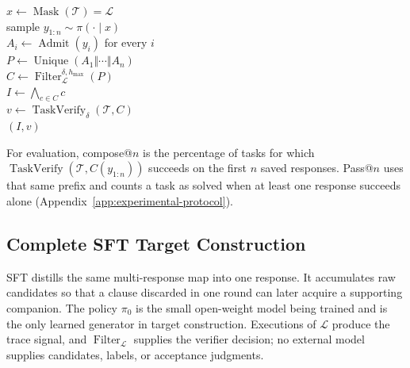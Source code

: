 \begin{algorithm}[H]
\caption{CRAFT inference}
\label{alg:rcf}
\begin{algorithmic}
\algline \(x\leftarrow\operatorname{Mask}(\mathcal T)=\mathcal L\)\\
\algline sample \(y_{1:n}\sim\pi(\cdot\mid x)\)\\
\algline \(A_i\leftarrow\operatorname{Admit}(y_i)\) for every \(i\)\\
\algline \(P\leftarrow\operatorname{Unique}(A_1\Vert\cdots\Vert A_n)\)\\
\algline \(C\leftarrow\operatorname{Filter}_{\mathcal L}^{\delta,h_{\max}}(P)\)\\
\algline \(I\leftarrow\bigwedge_{c\in C}c\)\\
\algline \(v\leftarrow\operatorname{TaskVerify}_{\delta}(\mathcal T,C)\)\\
\algline {} \((I,v)\)\\
\end{algorithmic}
\end{algorithm}

For evaluation, compose@\(n\) is the percentage of tasks for which
\(\operatorname{TaskVerify}(\mathcal T,C(y_{1:n}))\) succeeds on the first
\(n\) saved responses.  Pass@\(n\) uses that same prefix and counts a task
as solved when at least one response succeeds alone
(Appendix~\ref{app:experimental-protocol}).

\subsection{Complete SFT Target Construction}

SFT distills the same multi-response map into one response.  It accumulates
raw candidates so that a clause discarded in one round can later acquire a
supporting companion.  The policy \(\pi_0\) is the small open-weight model
being trained and is the only learned generator in target construction.
Executions of \(\mathcal L\) produce the trace signal, and
\(\operatorname{Filter}_{\mathcal L}\) supplies the verifier decision; no
external model supplies candidates, labels, or acceptance judgments.

